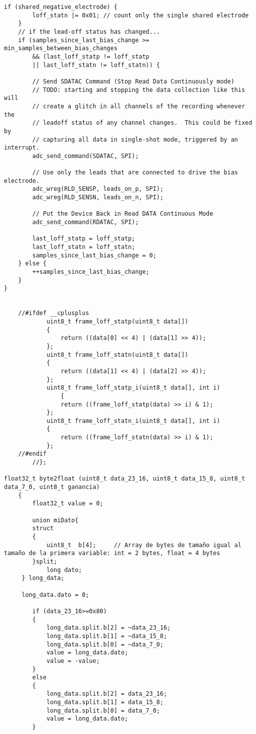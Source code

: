 \begin{lstlisting}[label=algoritmo:STM32F4:ADS1299.c,style = STM-code,frame=single,caption=STM32F4:ADS1299.c]
	if (shared_negative_electrode) {
		loff_statn |= 0x01;	// count only the single shared electrode
	}
	// if the lead-off status has changed...
	if (samples_since_last_bias_change >= min_samples_between_bias_changes
	    && (last_loff_statp != loff_statp
		|| last_loff_statn != loff_statn)) {

		// Send SDATAC Command (Stop Read Data Continuously mode)
		// TODO: starting and stopping the data collection like this will
		// create a glitch in all channels of the recording whenever the
		// leadoff status of any channel changes.  This could be fixed by
		// capturing all data in single-shot mode, triggered by an interrupt.
		adc_send_command(SDATAC, SPI);

		// Use only the leads that are connected to drive the bias electrode.
		adc_wreg(RLD_SENSP, leads_on_p, SPI);
		adc_wreg(RLD_SENSN, leads_on_n, SPI);

		// Put the Device Back in Read DATA Continuous Mode
		adc_send_command(RDATAC, SPI);

		last_loff_statp = loff_statp;
		last_loff_statn = loff_statn;
		samples_since_last_bias_change = 0;
	} else {
		++samples_since_last_bias_change;
	}
}


	//#ifdef __cplusplus
			uint8_t frame_loff_statp(uint8_t data[])
			{
				return ((data[0] << 4) | (data[1] >> 4));
			};
			uint8_t frame_loff_statn(uint8_t data[])
			{
				return ((data[1] << 4) | (data[2] >> 4));
			};
			uint8_t frame_loff_statp_i(uint8_t data[], int i)
				{
				return ((frame_loff_statp(data) >> i) & 1);
			};
			uint8_t frame_loff_statn_i(uint8_t data[], int i)
			{
				return ((frame_loff_statn(data) >> i) & 1);
			};
	//#endif
		//};

float32_t byte2float (uint8_t data_23_16, uint8_t data_15_8, uint8_t data_7_0, uint8_t ganancia)
	{
		float32_t value = 0;
		
		union miDato{
		struct
		{
			uint8_t  b[4];     // Array de bytes de tamaño igual al tamaño de la primera variable: int = 2 bytes, float = 4 bytes
		}split;
			long dato;
	 } long_data; 
		
	 long_data.dato = 0;
	 
		if (data_23_16>=0x80)
		{
			long_data.split.b[2] = ~data_23_16;
			long_data.split.b[1] = ~data_15_8;
			long_data.split.b[0] = ~data_7_0;
			value = long_data.dato;
			value = -value;
		}
		else
		{
			long_data.split.b[2] = data_23_16;
			long_data.split.b[1] = data_15_8;
			long_data.split.b[0] = data_7_0;
			value = long_data.dato;
		}
		

\end{lstlisting}
